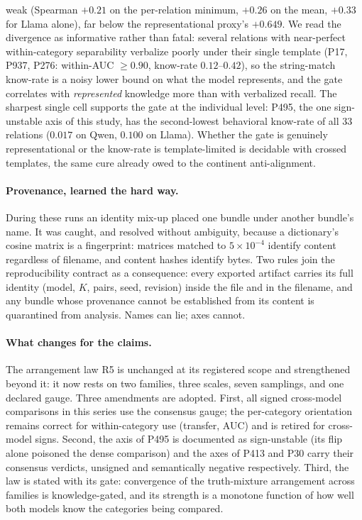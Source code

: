 \documentclass[11pt]{article}
\begin{document}
weak (Spearman $+0.21$ on the per-relation minimum, $+0.26$ on the mean,
$+0.33$ for Llama alone), far below the representational proxy's $+0.649$.
We read the divergence as informative rather than fatal: several relations
with near-perfect within-category separability verbalize poorly under
their single template (P17, P937, P276: within-AUC $\geq 0.90$, know-rate
$0.12$--$0.42$), so the string-match know-rate is a noisy lower bound on
what the model represents, and the gate correlates with \emph{represented}
knowledge more than with verbalized recall. The sharpest single cell
supports the gate at the individual level: P495, the one sign-unstable
axis of this study, has the second-lowest behavioral know-rate of all
$33$ relations ($0.017$ on Qwen, $0.100$ on Llama). Whether the gate is
genuinely representational or the know-rate is template-limited is
decidable with crossed templates, the same cure already owed to the
continent anti-alignment.

\paragraph{Provenance, learned the hard way.} During these runs an
identity mix-up placed one bundle under another bundle's name. It was
caught, and resolved without ambiguity, because a dictionary's cosine
matrix is a fingerprint: matrices matched to $5 \times 10^{-4}$ identify
content regardless of filename, and content hashes identify bytes. Two
rules join the reproducibility contract as a consequence: every exported
artifact carries its full identity (model, $K$, pairs, seed, revision)
inside the file and in the filename, and any bundle whose provenance
cannot be established from its content is quarantined from analysis.
Names can lie; axes cannot.

\paragraph{What changes for the claims.} The arrangement law R5 is
unchanged at its registered scope and strengthened beyond it: it now rests
on two families, three scales, seven samplings, and one declared gauge.
Three amendments are adopted. First, all signed cross-model comparisons in
this series use the consensus gauge; the per-category orientation remains
correct for within-category use (transfer, AUC) and is retired for
cross-model signs. Second, the axis of P495 is documented as sign-unstable
(its flip alone poisoned the dense comparison) and the axes of P413 and
P30 carry their consensus verdicts, unsigned and semantically negative
respectively. Third, the law is stated with its gate: convergence of the
truth-mixture arrangement across families is knowledge-gated, and its
strength is a monotone function of how well both models know the
categories being compared.
\end{document}
